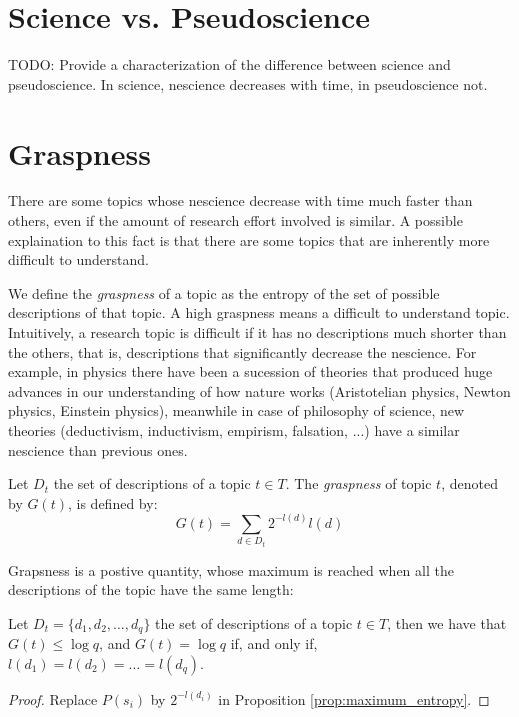 %
%

\section{Science vs. Pseudoscience}

{\color{red} TODO: Provide a characterization of the difference between science and pseudoscience. In science, nescience decreases with time, in pseudoscience not.}

%
%
\section{Graspness}

There are some topics whose nescience decrease with time much faster than others, even if the amount of research effort involved is similar. A possible explaination to this fact is that there are some topics that are inherently more difficult to understand.

We define the \emph{graspness} of a topic as the entropy of the set of possible descriptions of that topic. A high graspness means a difficult to understand topic. Intuitively, a research topic is difficult if it has no descriptions much shorter than the others, that is, descriptions that significantly decrease the nescience. For example, in physics there have been a sucession of theories that produced huge advances in our understanding of how nature works (Aristotelian physics, Newton physics, Einstein physics), meanwhile in case of philosophy of science, new theories (deductivism, inductivism, empirism, falsation, ...) have a similar nescience than previous ones.

\begin{definition}[Graspness]
Let $D_t$ the set of descriptions of a topic $t \in T$. The \emph{graspness} of topic $t$, denoted by $G(t)$, is defined by:
\[
G(t) = \sum_{d \in D_t} 2^{-l(d)} l(d)
\]
\end{definition}

Grapsness is a postive quantity, whose maximum is reached when all the descriptions of the topic have the same length:

\begin{proposition}
Let $D_t = \{ d_1, d_2, \ldots, d_q \}$ the set of descriptions of a topic $t \in T$, then we have that $G(t) \leq \log q$, and $G(t) = \log q$ if, and only if, $l(d_1) = l(d_2) = \ldots = l(d_q)$.
\end{proposition}
\begin{proof}
Replace $P(s_i)$ by $2^{-l(d_i)}$ in Proposition \ref{prop:maximum_entropy}.
\end{proof}

